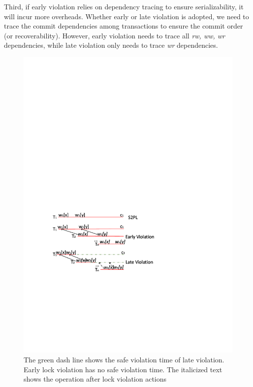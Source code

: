 \documentclass[conference]{IEEEtran}
\begin{document}
Third, if early violation relies on dependency tracing to ensure serializability, it will incur more overheads.
Whether early or late violation is adopted, we need to trace the commit dependencies among transactions to ensure the commit order (or recoverability).
However, early violation needs to trace all \emph{rw, ww, wr} dependencies, while late violation only needs to trace \emph{wr} dependencies.


\begin{figure}[tbp]
  \centerline{\includegraphics[scale=0.7]{figure/lock_violation_safe.pdf}}
  \caption
  {The green dash line shows the safe violation time of late violation.
  Early lock violation has no safe violation time.
  The italicized text shows the operation after lock violation actions}
\label{fig:lock_violation_safe}
\end{figure}
\end{document}
